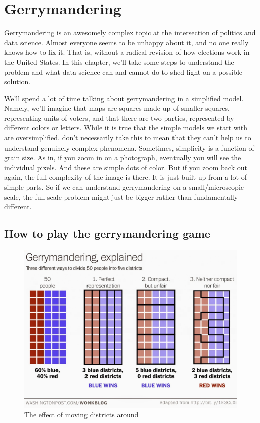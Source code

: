 \documentclass[
  openany]{book}
\begin{document}
\hypertarget{gerrymandering}{%
\chapter{Gerrymandering}\label{gerrymandering}}

Gerrymandering is an awesomely complex topic at the intersection of politics and data science. Almost everyone seems to be unhappy about it, and no one really knows how to fix it. That is, without a radical revision of how elections work in the United States. In this chapter, we'll take some steps to understand the problem and what data science can and cannot do to shed light on a possible solution.

We'll spend a lot of time talking about gerrymandering in a simplified model. Namely, we'll imagine that maps are squares made up of smaller squares, representing units of voters, and that there are two parties, represented by different colors or letters. While it is true that the simple models we start with are oversimplified, don't necessarily take this to mean that they can't help us to understand genuinely complex phenomena. Sometimes, simplicity is a function of grain size. As in, if you zoom in on a photograph, eventually you will see the individual pixels. And these are simple dots of color. But if you zoom back out again, the full complexity of the image is there. It is just built up from a lot of simple parts. So if we can understand gerrymandering on a small/microscopic scale, the full-scale problem might just be bigger rather than fundamentally different.

\hypertarget{how-to-play-the-gerrymandering-game}{%
\section*{How to play the gerrymandering game}\label{how-to-play-the-gerrymandering-game}}

\begin{figure}

{\centering \includegraphics[width=0.9\linewidth]{images/gerrymandering_simple} 

}

\caption{The effect of moving districts around}\label{fig:gerrymandering-simple}
\end{figure}
\end{document}
